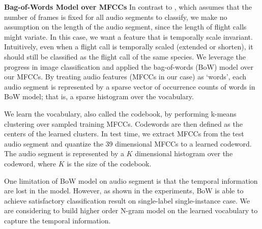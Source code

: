 \documentclass{article} %
\begin{document}
\textbf{Bag-of-Words Model over MFCCs}
\label{sec:bow}
In contrast to \cite{Dufour_NIPSW13}, which assumes that the number of frames is fixed for all audio segments to classify, we make no assumption on the length of the audio segment, since the length of flight calls might variate. In this case, we want a feature that is temporally scale invariant. Intuitively, even when a flight call is temporally scaled (extended or shorten), it should still be classified as the flight call of the same species. We leverage the progress in image classification and applied the bag-of-words (BoW) model \cite{Li_CVPR05} over our MFCCs. By treating audio features (MFCCs in our case) as `words', each audio segment is represented by a sparse vector of occurrence counts of words in BoW model; that is, a sparse histogram over the vocabulary.

We learn the vocabulary, also called the codebook, by performing k-means clustering over sampled training MFCCs. Codewords are then defined as the centers of the learned clusters. In test time, we extract MFCCs from the test audio segment and quantize the 39 dimensional MFCCs to a learned codeword. The audio segment is represented by a $K$ dimensional histogram over the codeword, where $K$ is the size of the codebook. 

One limitation of BoW model on audio segment is that the temporal information are lost in the model. However, as shown in the experiments, BoW is able to achieve satisfactory classification result on single-label single-instance case. We are considering to build higher order N-gram model on the learned vocabulary to capture the temporal information.

\end{document}
